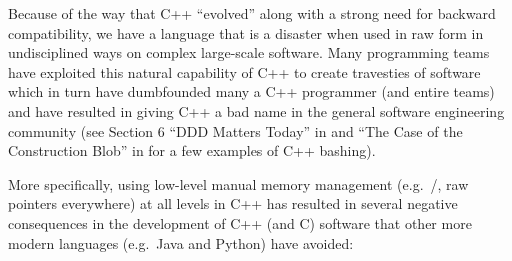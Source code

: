 \documentclass[pdf,ps2pdf,11pt]{SANDreport}
\begin{document}
Because of the way that C++ ``evolved'' along with a strong need for
backward compatibility, we have a language that is a disaster when
used in raw form in undisciplined ways on complex large-scale
software.  Many programming teams have exploited this natural
capability of C++ to create travesties of software which in turn have
dumbfounded many a C++ programmer (and entire teams) and have resulted
in giving C++ a bad name in the general software engineering community
(see Section 6 ``DDD Matters Today'' in
{}\cite{DomainDrivenDesignQuickly} and ``The Case of the Construction
Blob'' in {}\cite[Chapter 9]{WorkingEffectivelyWithLegacyCode05} for a
few examples of C++ bashing).

More specifically, using low-level manual memory management (e.g.\
{}/{}, raw pointers everywhere) at all
levels in C++ has resulted in several negative consequences in the
development of C++ (and C) software that other more modern languages
(e.g.\ Java and Python) have avoided:
\end{document}

